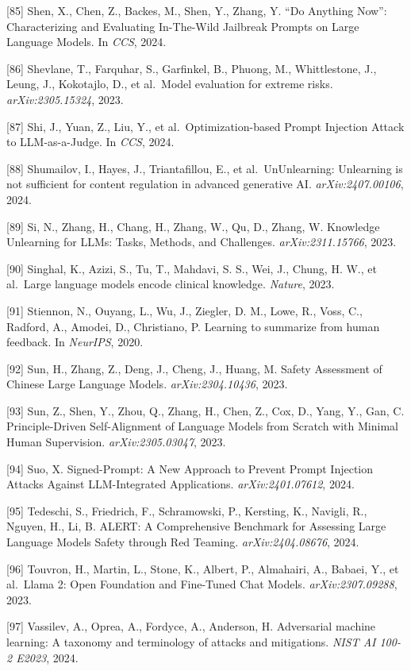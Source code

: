 {[}85{]} Shen, X., Chen, Z., Backes, M., Shen, Y., Zhang, Y. ``Do Anything Now'': Characterizing and Evaluating In-The-Wild Jailbreak Prompts on Large Language Models. In \emph{CCS}, 2024.

{[}86{]} Shevlane, T., Farquhar, S., Garfinkel, B., Phuong, M., Whittlestone, J., Leung, J., Kokotajlo, D., et al.~Model evaluation for extreme risks. \emph{arXiv:2305.15324}, 2023.

{[}87{]} Shi, J., Yuan, Z., Liu, Y., et al.~Optimization-based Prompt Injection Attack to LLM-as-a-Judge. In \emph{CCS}, 2024.

{[}88{]} Shumailov, I., Hayes, J., Triantafillou, E., et al.~UnUnlearning: Unlearning is not sufficient for content regulation in advanced generative AI. \emph{arXiv:2407.00106}, 2024.

{[}89{]} Si, N., Zhang, H., Chang, H., Zhang, W., Qu, D., Zhang, W. Knowledge Unlearning for LLMs: Tasks, Methods, and Challenges. \emph{arXiv:2311.15766}, 2023.

{[}90{]} Singhal, K., Azizi, S., Tu, T., Mahdavi, S. S., Wei, J., Chung, H. W., et al.~Large language models encode clinical knowledge. \emph{Nature}, 2023.

{[}91{]} Stiennon, N., Ouyang, L., Wu, J., Ziegler, D. M., Lowe, R., Voss, C., Radford, A., Amodei, D., Christiano, P. Learning to summarize from human feedback. In \emph{NeurIPS}, 2020.

{[}92{]} Sun, H., Zhang, Z., Deng, J., Cheng, J., Huang, M. Safety Assessment of Chinese Large Language Models. \emph{arXiv:2304.10436}, 2023.

{[}93{]} Sun, Z., Shen, Y., Zhou, Q., Zhang, H., Chen, Z., Cox, D., Yang, Y., Gan, C. Principle-Driven Self-Alignment of Language Models from Scratch with Minimal Human Supervision. \emph{arXiv:2305.03047}, 2023.

{[}94{]} Suo, X. Signed-Prompt: A New Approach to Prevent Prompt Injection Attacks Against LLM-Integrated Applications. \emph{arXiv:2401.07612}, 2024.

{[}95{]} Tedeschi, S., Friedrich, F., Schramowski, P., Kersting, K., Navigli, R., Nguyen, H., Li, B. ALERT: A Comprehensive Benchmark for Assessing Large Language Models Safety through Red Teaming. \emph{arXiv:2404.08676}, 2024.

{[}96{]} Touvron, H., Martin, L., Stone, K., Albert, P., Almahairi, A., Babaei, Y., et al.~Llama 2: Open Foundation and Fine-Tuned Chat Models. \emph{arXiv:2307.09288}, 2023.

{[}97{]} Vassilev, A., Oprea, A., Fordyce, A., Anderson, H. Adversarial machine learning: A taxonomy and terminology of attacks and mitigations. \emph{NIST AI 100-2 E2023}, 2024.

